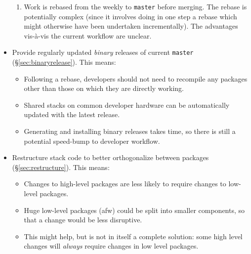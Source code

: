\documentclass[DM,toc]{lsstdoc}
\begin{document}
\begin{itemize}
{\begin{itemize}
{\begin{enumerate}
          \item{Work is rebased from the weekly to \texttt{master} before
          merging. The rebase is potentially complex (since it involves doing
          in one step a rebase which might otherwise have been undertaken
          incrementally). The advantages vis-\`a-vis the current workflow are
          unclear.}

        \end{enumerate}

      }

    \end{itemize}

  }

  \item{Provide regularly updated \textit{binary} releases of current
  \texttt{master} (\S\ref{sec:binaryrelease}). This means:

    \begin{itemize}

      \item{Following a rebase, developers should not need to recompile any
      packages other than those on which they are directly working.}

      \item{Shared stacks on common developer hardware can be automatically
      updated with the latest release.}

      \item{Generating and installing binary releases takes time, so there is
      still a potential speed-bump to developer workflow.}

    \end{itemize}

  }

  \item{Restructure stack code to better orthogonalize between packages
  (\S\ref{sec:restructure}). This means:

    \begin{itemize}

      \item{Changes to high-level packages are less likely to require changes
      to low-level packages.}

      \item{Huge low-level packages (afw) could be split into smaller
      components, so that a change would be less disruptive.}

      \item{This might help, but is not in itself a complete solution: some
      high level changes will \textit{always} require changes in low level
      packages.}


\end{itemize}}
\end{itemize}
\end{document}
